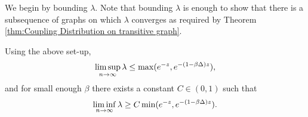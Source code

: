 	We begin by bounding $\lambda$. Note that bounding $\lambda$ is enough to show that there is a subsequence of graphs on which $\lambda$ converges as required by Theorem \ref{thm:Coupling Distribution on transitive graph}.
	\begin{lemma}
	\label{lem:nDlambda}
		Using the above set-up, 
		\begin{equation}
			\limsup_{n \rightarrow \infty} \lambda \leq \max(e^{-z}, e^{-(1 - \beta\Delta)z}),
			\label{eq:limsup lambda nD}
		\end{equation}
		and for small enough $\beta$ there exists a constant $C \in (0,1)$ such that
		\begin{equation}
			\liminf_{n \rightarrow \infty} \lambda \geq C \min(e^{-z}, e^{-(1 - \beta\Delta)z}).
			\label{eq:liminf lambda nD}
		\end{equation}
	\end{lemma}
